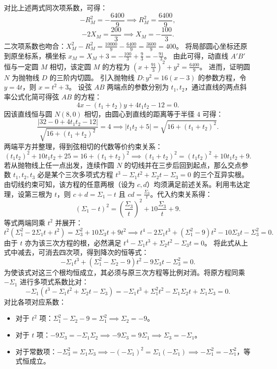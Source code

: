 \begin{solution}
对比上述两式同次项系数，可得：
\[ -R_M^2 = -\frac{6400}{9} \implies R_M^2 = \frac{6400}{9}, \]
\[ -2X_M = \frac{200}{3} \implies X_M = -\frac{100}{3}. \]
二次项系数也吻合：$X_M^2 - R_M^2 = \frac{10000}{9} - \frac{6400}{9} = \frac{3600}{9} = 400$。
将局部圆心坐标还原到原坐标系，横坐标 $x_M = X_M + 3 = -\frac{100}{3} + \frac{9}{3} = -\frac{91}{3}$。
由此可得，动直线 $A'B'$ 恒与一定圆 $M$ 相切，该定圆 $M$ 的方程为 $\left(x + \frac{91}{3}\right)^2 + y^2 = \frac{6400}{9}$。
进而，证明圆 $N$ 为抛物线 $D$ 的三阶内切圆。
引入抛物线 $D: y^2 = 16(x - 3)$ 的参数方程，令 $y = 4t$，则 $x = t^2 + 3$。
设弦 $AB$ 两端点的参数分别为 $t_1, t_2$，通过直线的两点斜率公式化简可得弦 $AB$ 的方程：
\[ 4x - (t_1+t_2)y + 4t_1 t_2 - 12 = 0. \]
因该直线恒与圆 $N(8,0)$ 相切，由圆心到直线的距离等于半径 $4$ 可得：
\[ \frac{|32 - 0 + 4t_1 t_2 - 12|}{\sqrt{16 + (t_1+t_2)^2}} = 4 \implies |t_1 t_2 + 5| = \sqrt{16 + (t_1+t_2)^2}. \]
两端平方并整理，得到弦相切的代数等价约束关系：
\[ (t_1 t_2)^2 + 10t_1 t_2 + 25 = 16 + (t_1+t_2)^2 \implies (t_1+t_2)^2 = (t_1 t_2)^2 + 10t_1 t_2 + 9. \]
若从抛物线上任一点出发，连续作圆 $N$ 的切线并在三步后回到起点，那么交点参数 $t_1, t_2, t_3$ 必是某个三次多项式方程 $t^3 - \Sigma_1 t^2 + \Sigma_2 t - \Sigma_3 = 0$ 的三个互异实根。
由切线约束可知，该方程的任意两根（设为 $c, d$）均须满足前述关系。利用韦达定理，设第三根为 $t$，则 $c+d = \Sigma_1 - t$ 且 $cd = \frac{\Sigma_3}{t}$。代入约束关系得：
\[ (\Sigma_1 - t)^2 = \left(\frac{\Sigma_3}{t}\right)^2 + 10\frac{\Sigma_3}{t} + 9. \]
等式两端同乘 $t^2$ 并展开：
\[ t^2(\Sigma_1^2 - 2\Sigma_1 t + t^2) = \Sigma_3^2 + 10\Sigma_3 t + 9t^2 \implies t^4 - 2\Sigma_1 t^3 + (\Sigma_1^2 - 9)t^2 - 10\Sigma_3 t - \Sigma_3^2 = 0. \]
由于 $t$ 亦为该三次方程的根，必然满足 $t^4 - \Sigma_1 t^3 + \Sigma_2 t^2 - \Sigma_3 t = 0$。
将此式从上式中减去，可消去四次项，得到降次的恒等式：
\[ -\Sigma_1 t^3 + (\Sigma_1^2 - \Sigma_2 - 9)t^2 - 9\Sigma_3 t - \Sigma_3^2 = 0. \]
为使该式对这三个根均恒成立，其必须与原三次方程等比例对消。将原方程同乘 $-\Sigma_1$ 进行多项式系数比对：
\[ -\Sigma_1(t^3 - \Sigma_1 t^2 + \Sigma_2 t - \Sigma_3) = -\Sigma_1 t^3 + \Sigma_1^2 t^2 - \Sigma_1 \Sigma_2 t + \Sigma_1 \Sigma_3 = 0. \]
对比各项对应系数：
\begin{itemize}
\item 对于 $t^2$ 项：$\Sigma_1^2 - \Sigma_2 - 9 = \Sigma_1^2 \implies \Sigma_2 = -9$。
\item 对于 $t$ 项：$-9\Sigma_3 = -\Sigma_1 \Sigma_2 \implies -9\Sigma_3 = 9\Sigma_1 \implies \Sigma_3 = -\Sigma_1$。
\item 对于常数项：$-\Sigma_3^2 = \Sigma_1 \Sigma_3 \implies -(-\Sigma_1)^2 = \Sigma_1(-\Sigma_1) \implies -\Sigma_1^2 = -\Sigma_1^2$，等式恒成立。

\end{itemize}
\end{solution}

